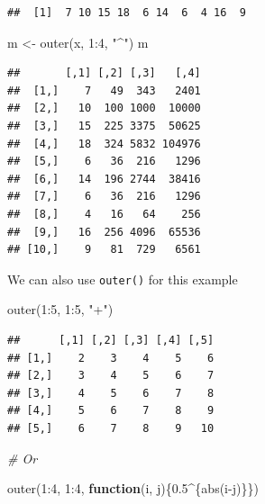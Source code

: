 \documentclass[
]{book}
\newenvironment{Shaded}{\begin{snugshade}}{\end{snugshade}}
\newcommand{\CommentTok}[1]{\textcolor[rgb]{0.56,0.35,0.01}{\textit{#1}}}
\newcommand{\ControlFlowTok}[1]{\textcolor[rgb]{0.13,0.29,0.53}{\textbf{#1}}}
\newcommand{\DecValTok}[1]{\textcolor[rgb]{0.00,0.00,0.81}{#1}}
\newcommand{\FloatTok}[1]{\textcolor[rgb]{0.00,0.00,0.81}{#1}}
\newcommand{\FunctionTok}[1]{\textcolor[rgb]{0.00,0.00,0.00}{#1}}
\newcommand{\NormalTok}[1]{#1}
\newcommand{\OtherTok}[1]{\textcolor[rgb]{0.56,0.35,0.01}{#1}}
\newcommand{\SpecialCharTok}[1]{\textcolor[rgb]{0.00,0.00,0.00}{#1}}
\newcommand{\StringTok}[1]{\textcolor[rgb]{0.31,0.60,0.02}{#1}}
\begin{document}
\begin{verbatim}
##  [1]  7 10 15 18  6 14  6  4 16  9
\end{verbatim}

\begin{Shaded}
\begin{Highlighting}[]
\NormalTok{m }\OtherTok{\textless{}{-}} \FunctionTok{outer}\NormalTok{(x, }\DecValTok{1}\SpecialCharTok{:}\DecValTok{4}\NormalTok{, }\StringTok{"\^{}"}\NormalTok{)}
\NormalTok{m}
\end{Highlighting}
\end{Shaded}

\begin{verbatim}
##       [,1] [,2] [,3]   [,4]
##  [1,]    7   49  343   2401
##  [2,]   10  100 1000  10000
##  [3,]   15  225 3375  50625
##  [4,]   18  324 5832 104976
##  [5,]    6   36  216   1296
##  [6,]   14  196 2744  38416
##  [7,]    6   36  216   1296
##  [8,]    4   16   64    256
##  [9,]   16  256 4096  65536
## [10,]    9   81  729   6561
\end{verbatim}

We can also use \texttt{outer()} for this example

\begin{Shaded}
\begin{Highlighting}[]
\FunctionTok{outer}\NormalTok{(}\DecValTok{1}\SpecialCharTok{:}\DecValTok{5}\NormalTok{, }\DecValTok{1}\SpecialCharTok{:}\DecValTok{5}\NormalTok{, }\StringTok{"+"}\NormalTok{)}
\end{Highlighting}
\end{Shaded}

\begin{verbatim}
##      [,1] [,2] [,3] [,4] [,5]
## [1,]    2    3    4    5    6
## [2,]    3    4    5    6    7
## [3,]    4    5    6    7    8
## [4,]    5    6    7    8    9
## [5,]    6    7    8    9   10
\end{verbatim}

\begin{Shaded}
\begin{Highlighting}[]
\CommentTok{\# Or}

\FunctionTok{outer}\NormalTok{(}\DecValTok{1}\SpecialCharTok{:}\DecValTok{4}\NormalTok{, }\DecValTok{1}\SpecialCharTok{:}\DecValTok{4}\NormalTok{, }\ControlFlowTok{function}\NormalTok{(i, j)\{}\FloatTok{0.5}\SpecialCharTok{\^{}}\NormalTok{\{}\FunctionTok{abs}\NormalTok{(i}\SpecialCharTok{{-}}\NormalTok{j)\}\})}
\end{Highlighting}
\end{Shaded}
\end{document}

